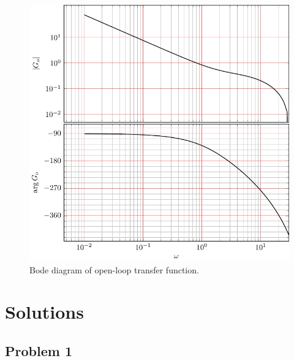 \documentclass{scrartcl}
\begin{document}
  \begin{figure}
  \begin{center}
  \includegraphics[width=0.8\linewidth]{bode-openloop-exam}
  \caption{Bode diagram of open-loop transfer function.}
  \label{fig:bode}
  \end{center}
  \end{figure}
\section*{Solutions}
\label{sec-3}
\subsection*{Problem 1}
\label{sec-3-1}
\end{document}
